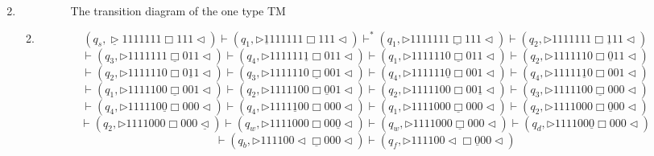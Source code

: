 \documentclass[12pt,a4paper]{article}
\makeatletter
\newtheorem*{solution}{Solution}
\theoremstyle{definition}
\renewenvironment{solution}[1][Solution] {\par\pushQED{\qed}\normalfont\topsep6\p@\@plus6\p@\relax\trivlist\item[\hskip\labelsep\bfseries#1\@addpunct{.}]\ignorespaces}{\popQED\endtrivlist\@endpefalse} \makeatother
\makeatother
\begin{document}
\begin{enumerate}
\begin{solution}
\begin{enumerate}
\begin{figure}[!htbp]
				\caption{The transition diagram of the one type TM}
				\label{Fig-Diagram}
			\end{figure}
			\item $$(q_s,\underline{\triangleright}  1  1  1  1  1  1  1  \Box 1  1  1   \triangleleft)
			\vdash (q_1,\triangleright  \underline{1}  1  1  1  1  1  1  \Box 1  1  1   \triangleleft)
			\vdash^* (q_1,\triangleright  1  1  1  1  1  1  1  \underline{\Box} 1  1  1   \triangleleft)
			\vdash (q_2,\triangleright  1  1  1  1  1  1  1  \Box \underline{1}  1  1   \triangleleft)$$
			$$\vdash (q_3,\triangleright  1  1  1  1  1  1  1  \underline{\Box} 0  1  1   \triangleleft)
			\vdash (q_4,\triangleright  1  1  1  1  1  1  \underline{1}  \Box 0  1  1   \triangleleft)
			\vdash (q_1,\triangleright  1  1  1  1  1  1  0  \underline{\Box} 0  1  1   \triangleleft)
			\vdash (q_2,\triangleright  1  1  1  1  1  1  0  \Box \underline{0}  1  1   \triangleleft)$$
			$$\vdash (q_2,\triangleright  1  1  1  1  1  1  0  \Box 0  \underline{1}  1   \triangleleft)
			\vdash (q_3,\triangleright  1  1  1  1  1  1  0  \underline{\Box} 0  0  1   \triangleleft)
			\vdash (q_4,\triangleright  1  1  1  1  1  1  \underline{0}  \Box 0  0  1   \triangleleft)
			\vdash (q_4,\triangleright  1  1  1  1  1  \underline{1}  0  \Box 0  0  1   \triangleleft)$$
			$$\vdash (q_1,\triangleright  1  1  1  1  1  0  0  \underline{\Box} 0  0  1   \triangleleft)
			\vdash (q_2,\triangleright  1  1  1  1  1  0  0  \Box \underline{0}  0  1   \triangleleft)
			\vdash (q_2,\triangleright  1  1  1  1  1  0  0  \Box 0  0  \underline{1}   \triangleleft)
			\vdash (q_3,\triangleright  1  1  1  1  1  0  0  \underline{\Box} 0  0  0   \triangleleft)$$
			$$\vdash (q_4,\triangleright  1  1  1  1  1  0  \underline{0}  \Box 0  0  0   \triangleleft)
			\vdash (q_4,\triangleright  1  1  1  1  \underline{1}  0  0  \Box 0  0  0   \triangleleft)
			\vdash (q_1,\triangleright  1  1  1  1  0  0  0  \underline{\Box} 0  0  0   \triangleleft)
			\vdash (q_2,\triangleright  1  1  1  1  0  0  0  \Box \underline{0}  0  0   \triangleleft)$$
			$$\vdash (q_2,\triangleright  1  1  1  1  0  0  0  \Box 0  0  0   \underline{\triangleleft})
			\vdash (q_w,\triangleright  1  1  1  1  0  0  0  \Box 0  0  \underline{0}   \triangleleft)
			\vdash (q_w,\triangleright  1  1  1  1  0  0  0  \underline{\Box} 0  0  0   \triangleleft)
			\vdash (q_d,\triangleright  1  1  1  1  0  0  \underline{0}  \Box 0  0  0   \triangleleft)$$
			$$\vdash (q_b,\triangleright  1  1  1  1  0  0  \triangleleft  \underline{\Box} 0  0  0   \triangleleft)
			\vdash (q_f,\triangleright  1  1  1  1  0  0  \triangleleft  \Box \underline{0}  0  0   \triangleleft)
$$
\end{enumerate}
\end{solution}
\end{enumerate}
\end{document}
